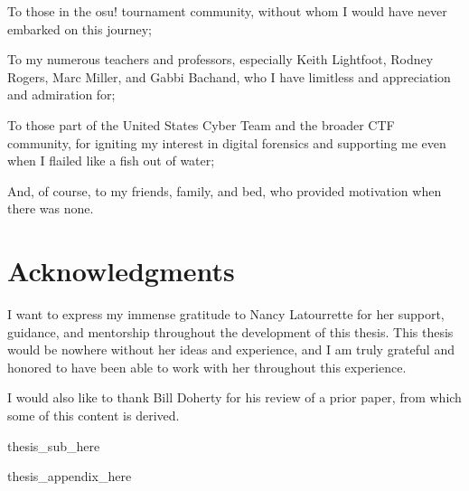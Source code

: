 \documentclass[letterpaper,12pt]{report}
\begin{document}
To those in the osu! tournament community, without whom I would have
never embarked on this journey;

To my numerous teachers and professors, especially Keith Lightfoot,
Rodney Rogers, Marc Miller, and Gabbi Bachand, who I have limitless and
appreciation and admiration for;

To those part of the United States Cyber Team and the broader CTF
community, for igniting my interest in digital forensics and supporting
me even when I flailed like a fish out of water;

And, of course, to my friends, family, and bed, who provided motivation
when there was none.


\newpage

\section*{Acknowledgments}

I want to express my immense gratitude to Nancy Latourrette for her
support, guidance, and mentorship throughout the development of this
thesis. This thesis would be nowhere without her ideas and experience,
and I am truly grateful and honored to have been able to work with her
throughout this experience.

I would also like to thank Bill Doherty for his review of a prior paper,
from which some of this content is derived.


\newpage
\renewcommand*\contentsname{Table of Contents}
\tableofcontents

\newpage
\listoftables

\newpage
\listoffigures

\newpage
\renewcommand{\lstlistlistingname}{List of Code Listings}
\lstlistoflistings

\newpage
{}
\setcounter{page}{1}
\linespread{2}

{{thesis_sub_here}}


\singlespacing
\printbibliography

\doublespacing
\appendix

\appendix

{{thesis_appendix_here}}
\end{document}

